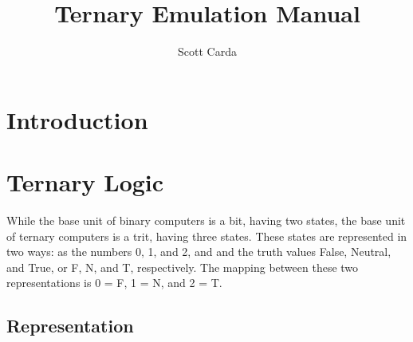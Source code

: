 \documentclass[12pt]{article}
\begin{document}


\title{Ternary Emulation Manual}
\date{}
\author{Scott Carda}

\maketitle
\newpage


\tableofcontents
\newpage


\section{Introduction} \label{sec:Intro}

\section{Ternary Logic} \label{sec:Logic}

While the base unit of binary computers is a bit, having two states, the base unit of ternary
computers is a trit, having three states. These states are represented in two ways: as the
numbers 0, 1, and 2, and and the truth values False, Neutral, and True, or F, N, and T,
respectively. The mapping between these two representations is 0 = F, 1 = N, and 2 = T.

\subsection{Representation}
\end{document}
